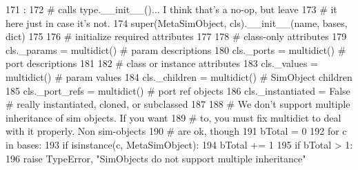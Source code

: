 \begin{DoxyCode}
171                                         :
172         # calls type.__init__()... I think that's a no-op, but leave
173         # it here just in case it's not.
174         super(MetaSimObject, cls).__init__(name, bases, dict)
175 
176         # initialize required attributes
177 
178         # class-only attributes
179         cls._params = multidict() # param descriptions
180         cls._ports = multidict()  # port descriptions
181 
182         # class or instance attributes
183         cls._values = multidict()   # param values
184         cls._children = multidict() # SimObject children
185         cls._port_refs = multidict() # port ref objects
186         cls._instantiated = False # really instantiated, cloned, or subclassed
187 
188         # We don't support multiple inheritance of sim objects.  If you want
189         # to, you must fix multidict to deal with it properly. Non sim-objects
190         # are ok, though
191         bTotal = 0
192         for c in bases:
193             if isinstance(c, MetaSimObject):
194                 bTotal += 1
195             if bTotal > 1:
196                 raise TypeError, "SimObjects do not support multiple inheritance"
      

\end{DoxyCode}
